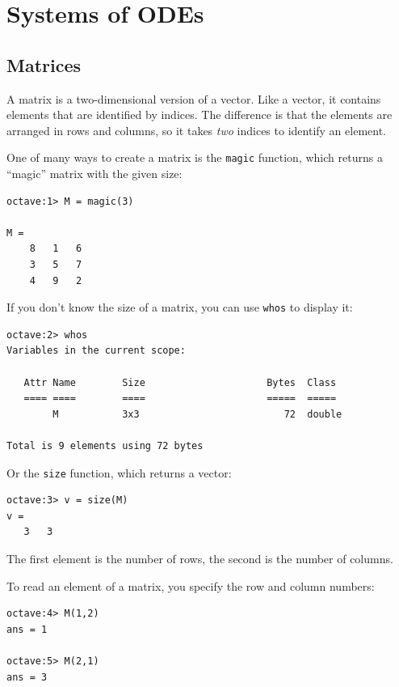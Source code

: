 
\chapter{Systems of ODEs}

\section{Matrices}

A matrix is a two-dimensional version of a vector. Like a vector,
it contains elements that are identified by indices. The difference
is that the elements are arranged in rows and columns, so it takes
{\em two} indices to identify an element.

One of many ways to create a matrix is the {\tt magic} function,
which returns a ``magic'' matrix with the given size:

\begin{verbatim}
octave:1> M = magic(3)

M = 
    8   1   6
    3   5   7
    4   9   2
\end{verbatim}

If you don't know the size of a matrix, you can use {\tt whos} to
display it:

\begin{verbatim}
octave:2> whos
Variables in the current scope:

   Attr Name        Size                     Bytes  Class
   ==== ====        ====                     =====  ===== 
        M           3x3                         72  double

Total is 9 elements using 72 bytes
\end{verbatim}

Or the {\tt size} function, which returns a vector:

\begin{verbatim}
octave:3> v = size(M)
v =
   3   3
\end{verbatim}

The first element is the number of rows, the second is the number of
columns.

To read an element of a matrix, you specify the row and column numbers:

\begin{verbatim}
octave:4> M(1,2)
ans = 1

octave:5> M(2,1)
ans = 3
\end{verbatim}

